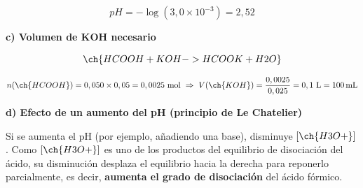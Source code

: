 \begin{exerciseEVAU}
\begin{solu}
        \begin{equation*}
            pH = -\log(3,0\times10^{-3}) = 2,52
        \end{equation*}

        \textbf{c) Volumen de KOH necesario}

        \begin{equation*}
            \ch{HCOOH + KOH -> HCOOK + H2O}
        \end{equation*}

        \begin{equation*}
            n(\ch{HCOOH}) = 0,050\times0,05 = 0,0025 \ \text{mol} \ \Rightarrow \ V(\ch{KOH}) = \dfrac{0,0025}{0,025} = 0,1 \ \si{\litre} = \SI{100}{\milli\litre}
        \end{equation*}

        \textbf{d) Efecto de un aumento del pH (principio de Le Chatelier)}

        Si se aumenta el pH (por ejemplo, añadiendo una base), disminuye \([\ch{H3O+}]\). Como \([\ch{H3O+}]\) es uno de los productos del equilibrio de disociación del ácido, su disminución desplaza el equilibrio hacia la derecha para reponerlo parcialmente, es decir, \textbf{aumenta el grado de disociación} del ácido fórmico.

    \end{solu}
\end{exerciseEVAU}


